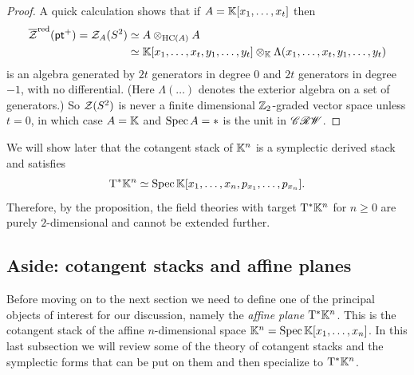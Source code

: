 \begin{proof}
	A quick calculation shows that if $A = \mathbb{K}[x_1, \dotsc, x_t]$ then
	\begin{align*}
		\overline{\mathcal{Z}}^{\mathrm{red}}(\mathsf{pt}^+) = \mathcal{Z}_A(S^2) & \simeq A \otimes_{\mathrm{HC}(A)} A \\
		& \simeq \mathbb{K}[x_1, \dotsc, x_t, y_1, \dotsc, y_t] \otimes_{\mathbb{K}} \Lambda(x_1, \dotsc, x_t, y_1, \dotsc, y_t)
	\end{align*}
	is an algebra generated by $2t$ generators in degree $0$ and $2t$ generators in degree $-1$, with no differential. (Here $\Lambda(\dotsc)$ denotes the exterior algebra on a set of generators.) So $\mathcal{Z}(S^2)$ is never a finite dimensional $\mathbb{Z}_2$-graded vector space unless $t = 0$, in which case $A = \mathbb{K}$ and $\operatorname{Spec} A = \ast$ is the unit in $\mathscr{CRW}$.
\end{proof}
We will show later that the cotangent stack of $\mathbb{K}^n$ is a symplectic derived stack and satisfies 
\begin{equation*}
	\mathrm{T}^\ast \mathbb{K}^n \simeq \operatorname{Spec} \mathbb{K}[x_1, \dotsc, x_n, p_{x_1}, \dotsc, p_{x_n}].
\end{equation*}
Therefore, by the proposition, the field theories with target $\mathrm{T}^\ast \mathbb{K}^n$ for $n \geq 0$ are purely $2$-dimensional and cannot be extended further.

\subsection{Aside: cotangent stacks and affine planes} \label{sec:affine-planes}

Before moving on to the next section we need to define one of the principal objects of interest for our discussion, namely the \emph{affine plane} $\mathrm{T}^\ast \mathbb{K}^n$. This is the cotangent stack of the affine $n$-dimensional space $\mathbb{K}^n = \operatorname{Spec} \mathbb{K}[x_1, \dotsc, x_n]$. In this last subsection we will review some of the theory of cotangent stacks and the symplectic forms that can be put on them and then specialize to $\mathrm{T}^\ast \mathbb{K}^n$.

